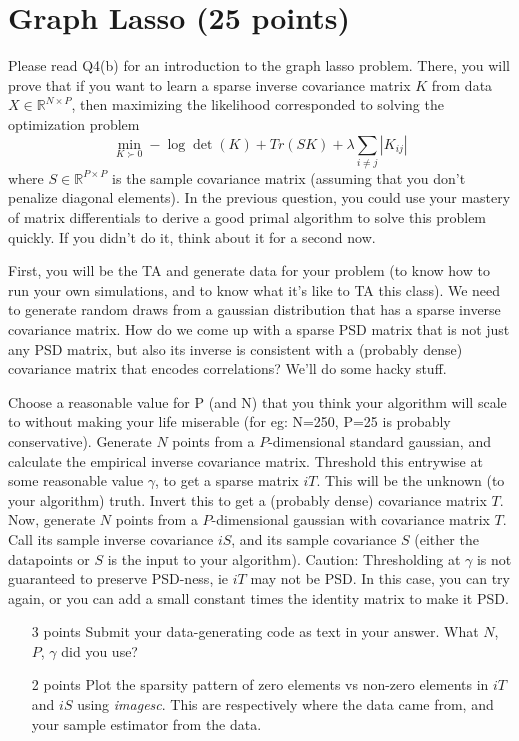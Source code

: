 \section{Graph Lasso (25 points)}

Please read Q4(b) for an introduction to the graph lasso problem. There, you will prove that if you want to learn a sparse inverse covariance matrix $K$ from data $X \in \mathbb{R}^{N \times P}$, then maximizing the likelihood corresponded to solving the optimization problem 
$$
\min_{K \succ 0} -\log \det (K) + Tr(SK) + \lambda \sum_{i \neq j} |K_{ij}|
$$
 where $S \in \mathbb{R}^{P \times P}$ is the sample covariance matrix (assuming that you don't penalize diagonal elements). In the previous question, you could use your mastery of matrix differentials to derive a good primal algorithm to solve this problem quickly. If you didn't do it, think about it for a second now.
 
First, you will be the TA and generate data for your problem (to know how to run your own simulations, and to know what it's like to TA this class). We need to generate random draws from a gaussian distribution that has a sparse inverse covariance matrix. How do we come up with a sparse PSD matrix that is not just any PSD matrix, but also its inverse is consistent with a (probably dense) covariance matrix that encodes correlations? We'll do some hacky stuff.

Choose a reasonable value for P (and N) that you think your algorithm will scale to without making your life miserable (for eg: N=250, P=25 is probably conservative). Generate $N$ points from a  $P$-dimensional standard gaussian, and calculate the empirical inverse covariance matrix. Threshold this entrywise at some reasonable value $\gamma$, to get a sparse matrix $iT$. This will be the unknown (to your algorithm) truth. Invert this to get a (probably dense) covariance matrix $T$. Now, generate $N$ points from a $P$-dimensional gaussian with covariance matrix $T$. 
Call its sample inverse covariance $iS$, and its sample covariance $S$ (either the datapoints or $S$ is the input to your algorithm). Caution: Thresholding at $\gamma$ is not guaranteed to preserve PSD-ness, ie $iT$ may not be PSD. In this case, you can try again, or you can add a small constant times the identity matrix to make it PSD.

\begin{enumerate}
\item [3 points] Submit your data-generating code as text in your answer. What $N$, $P$, $\gamma$ did you use?

\item [2 points] Plot the sparsity pattern of zero elements vs non-zero elements in $iT$ and $iS$ using \textit{imagesc}. This are respectively where the data came from, and your sample estimator from the data.
\end{enumerate} 

